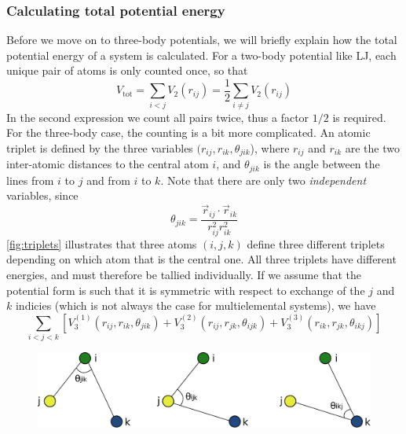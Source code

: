 \documentclass[twoside,english]{uiofysmaster}
\begin{document}
\subsubsection{Calculating total potential energy}
Before we move on to three-body potentials, we will briefly explain how the total potential energy of a system is calculated. 
For a two-body potential like LJ, each unique pair of atoms is only counted once, so that
\begin{equation}
 V_{\mathrm{tot}} = \sum_{i<j} V_2(r_{ij}) = \frac{1}{2}\sum_{i\neq j} V_2(r_{ij})
 \label{twoBodyPotentialEnergy}
\end{equation}
In the second expression we count all pairs twice, thus a factor $1/2$ is required. 
For the three-body case, the counting is a bit more complicated. An atomic triplet is defined by the three
variables $(r_{ij}, r_{ik}, \theta_{jik}$), where $r_{ij}$ and $r_{ik}$ are the 
two inter-atomic distances to the central atom $i$, and $\theta_{jik}$ is the angle between the lines from $i$ to $j$ and 
from $i$ to $k$. Note that there are only two \textit{independent} variables, since
\begin{equation}
 \theta_{jik} = \frac{\vec{r}_{ij} \cdot \vec{r}_{ik}}{r_{ij}^2r_{ik}^2}
\end{equation}
\autoref{fig:triplets} illustrates that three atoms $(i, j, k)$ define three different triplets depending
on which atom that is the central one. All three triplets have different energies, and must therefore be tallied individually.
If we assume that the potential form is such that it is symmetric with respect to exchange of the $j$ and $k$
indicies (which is not always the case for multielemental systems), we have
\begin{equation}
 \sum_{i<j<k}\left[V_3^{(1)}(r_{ij}, r_{ik}, \theta_{jik}) + V_3^{(2)}(r_{ij}, r_{jk}, \theta_{ijk}) + 
 V_3^{(3)}(r_{ik}, r_{jk}, \theta_{ikj})\right]
 \label{threeBodyPotentialEnergy1}
\end{equation}
\begin{figure}
\begin{center}
 \includegraphics[width = 0.9\linewidth]{Figures/Theory/triplets.pdf}
 \caption{}
 \label{fig:triplets}
\end{center}
\end{figure}
\end{document}
